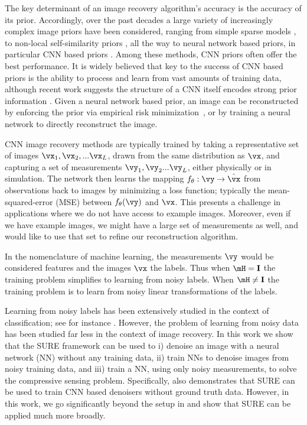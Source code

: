 \documentclass{article}
\newcommand\img{\vx}
\newcommand\obs{\vy}
\begin{document}
The key determinant of an image recovery algorithm's accuracy is the accuracy of its prior. 
Accordingly, over the past decades a large variety of increasingly complex image priors have been considered, ranging from simple sparse models \cite{SureShrink}, to non-local self-similarity priors \cite{BM3D}, all the way to neural network based priors, in particular CNN based priors \cite{DnCNN}. Among these methods, CNN priors often offer the best performance.
It is widely believed that key to the success of CNN based priors is the ability to process and learn from vast amounts of training data, although recent work suggests the structure of a CNN itself encodes strong prior information \cite{DeepImagePrior}.
Given a neural network based prior, an image can be reconstructed by enforcing the prior via empirical risk minimization~\cite{hand_global_2017}, or by training a neural network to directly reconstruct the image.

CNN image recovery methods are typically trained by taking a representative set of images $\img_1, \img_2, ... \img_L$, drawn from the same distribution as $\img$, and capturing a set of measurements $\obs_1,\obs_2 ... \obs_L$, either physically or in simulation.
The network then learns the mapping $f_\theta: \obs\rightarrow \hat{\img}$ from observations back to images by minimizing a loss function; typically the mean-squared-error (MSE) between $f_\theta(\obs)$ and $\img$. 
This presents a challenge in applications where we do not have access to example images. 
Moreover, even if we have example images, we might have a large set of measurements as well, and would like to use that set to refine our reconstruction algorithm. 

In the nomenclature of machine learning, the measurements $\obs$ would be considered features and the images $\img$ the labels. Thus when $\mH=\mathbf{I}$ the training problem simplifies to learning from noisy labels. When $\mH\neq\mathbf{I}$ the training problem is to learn from noisy linear transformations of the labels.


Learning from noisy labels has been extensively studied in the context of classification; see for instance  \cite{natarajan2013learning,xiao2015learning,liu2016classification,sukhbaatar2014training,sukhbaatar2014learning}. However, the problem of learning from noisy data has been studied far less in the context of image recovery. 
In this work we show that the SURE framework can be used to 
i) denoise an image with a neural network (NN) without any training data,
ii) train NNs to denoise images from noisy training data, and 
iii) train a NN, using only noisy measurements, to solve the compressive sensing problem. 
Specifically, \cite{MCSUREtraining} also demonstrates that SURE can be used to train CNN based denoisers without ground truth data. 
However, in this work, we go significantly beyond the setup in \cite{MCSUREtraining} and show that SURE can be applied much more broadly.
\end{document}
